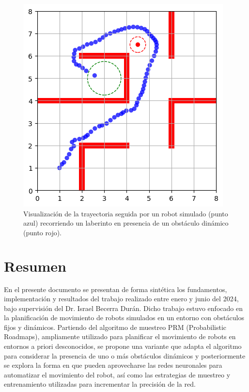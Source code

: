 \documentclass[spanish,mexico]{article}
\author{Luis Ramón Guajardo Maldonado}
\title{}
\date{\today}
\numberwithin{equation}{section}
\theoremstyle{definition}
\theoremstyle{remark}
\begin{document}
\fontsize{11pt}{14pt}\selectfont

\maketitle
\begin{figure}[hbtp]
\centering
\includegraphics[scale=0.9]{img/image1.png}
\caption{Visualización de la trayectoria seguida por un robot simulado (punto azul) recorriendo un laberinto en presencia de un obstáculo dinámico (punto rojo).}
\end{figure}

\section{Resumen}
En el presente documento se presentan de forma sintética los fundamentos, implementación y resultados del trabajo realizado entre enero y junio del 2024, bajo supervisión del Dr. Israel Becerra Durán. Dicho trabajo estuvo enfocado en la planificación de movimiento de robots simulados en un entorno con obstáculos fijos y dinámicos. Partiendo del algoritmo de muestreo PRM (Probabilistic Roadmaps), ampliamente utilizado para planificar el movimiento de robots en entornos a priori desconocidos, se propone una variante que adapta el algoritmo para considerar la presencia de uno o más obstáculos dinámicos y posteriormente se explora la forma en que pueden aprovecharse las redes neuronales para automatizar el movimiento del robot, así como las estrategias de muestreo y entrenamiento utilizadas para incrementar la precisión de la red.
\end{document}
